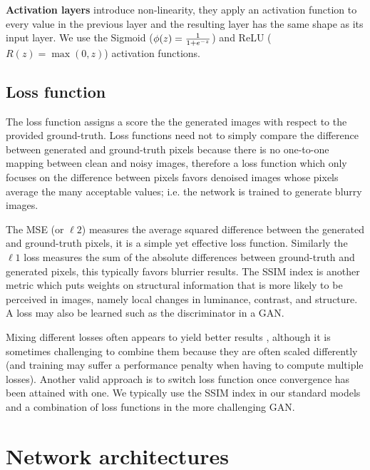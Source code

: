 \textbf{Activation layers} introduce non-linearity, they apply an activation function to every value in the previous layer and the resulting layer has the same shape as its input layer. We use the Sigmoid ($\phi(z)={1\over{1+e^{-z}}}$) and \ac{ReLU} ($R(z)=\max(0,z)$) activation functions. 


\subsection{Loss function}

The loss function assigns a score the the generated images with respect to the provided ground-truth. Loss functions need not to simply compare the difference between generated and ground-truth pixels because there is no one-to-one mapping between clean and noisy images, therefore a loss function which only focuses on the difference between pixels favors denoised images whose pixels average the many acceptable values; i.e. the network is trained to generate blurry images. \cite{pix2pix}

The \ac{MSE} (or $\ell 2$) measures the average squared difference between the generated and ground-truth pixels, it is a simple yet effective loss function. Similarly the $\ell 1$ loss measures the sum of the absolute differences between ground-truth and generated pixels, this typically favors blurrier results. The \ac{SSIM} index is another metric which puts weights on structural information that is more likely to be perceived in images, namely local changes in luminance, contrast, and structure. A loss may also be learned such as the discriminator in a \ac{GAN}.

Mixing different losses often appears to yield better results \cite{lossescomp}, although it is sometimes challenging to combine them because they are often scaled differently (and training may suffer a performance penalty when having to compute multiple losses). Another valid approach is to switch loss function once convergence has been attained with one. \cite{lossescomp} We typically use the \ac{SSIM} index in our standard models and a combination of loss functions in the more challenging \ac{GAN}.


\section{Network architectures}

